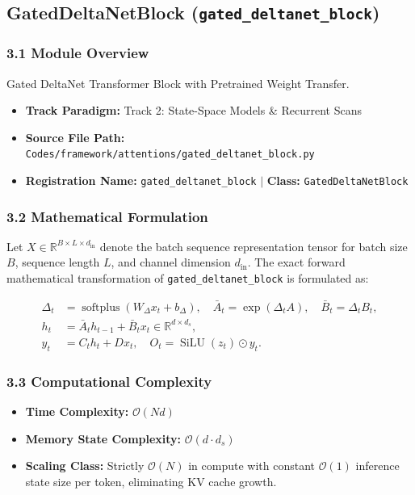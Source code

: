 \subsection{GatedDeltaNetBlock (\texttt{gated\_deltanet\_block})}
\label{sec:app_module_gated_deltanet_block}

\subsubsection*{3.1 Module Overview}
Gated DeltaNet Transformer Block with Pretrained Weight Transfer.
\begin{itemize}
    \item \textbf{Track Paradigm:} Track 2: State-Space Models \& Recurrent Scans
    \item \textbf{Source File Path:} \texttt{Codes/framework/attentions/gated\_deltanet\_block.py}
    \item \textbf{Registration Name:} \texttt{gated\_deltanet\_block} $\mid$ \textbf{Class:} \texttt{GatedDeltaNetBlock}
\end{itemize}

\subsubsection*{3.2 Mathematical Formulation}
Let $X \in \mathbb{R}^{B \times L \times d_{\text{in}}}$ denote the batch sequence representation tensor for batch size $B$, sequence length $L$, and channel dimension $d_{\text{in}}$. The exact forward mathematical transformation of \texttt{gated\_deltanet\_block} is formulated as:

\begin{align}
\Delta_t &= \operatorname{softplus}(W_\Delta x_t + b_\Delta), \quad \bar{A}_t = \exp(\Delta_t A), \quad \bar{B}_t = \Delta_t B_t, \\
h_t &= \bar{A}_t h_{t-1} + \bar{B}_t x_t \in \mathbb{R}^{d \times d_s}, \\
y_t &= C_t h_t + D x_t, \quad O_t = \operatorname{SiLU}(z_t) \odot y_t.
\end{align}


\subsubsection*{3.3 Computational Complexity}
\begin{itemize}
    \item \textbf{Time Complexity:} $\mathcal{O}(N d)$
    \item \textbf{Memory State Complexity:} $\mathcal{O}(d \cdot d_s)$
    \item \textbf{Scaling Class:} Strictly $\mathcal{O}(N)$ in compute with constant $\mathcal{O}(1)$ inference state size per token, eliminating KV cache growth.
\end{itemize}

